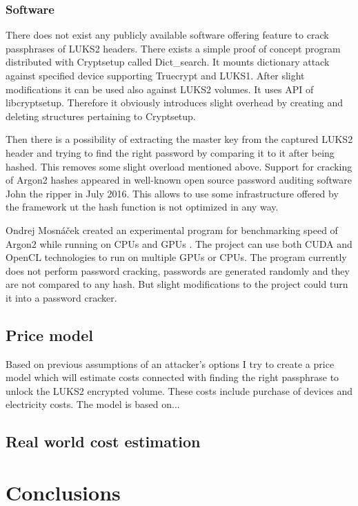 \documentclass[nolof]{fithesis3}
\begin{document}
\subsection{Software}
There does not exist any publicly available software offering feature to crack passphrases of LUKS2 headers. There exists a simple proof of concept program distributed with Cryptsetup called Dict\_search. It mounts dictionary attack against specified device supporting Truecrypt and LUKS1. After slight modifications it can be used also against LUKS2 volumes. It uses API of libcryptsetup. Therefore it obviously introduces slight overhead by creating and deleting structures pertaining to Cryptsetup.

Then there is a possibility of extracting the master key from the captured LUKS2 header and trying to find the right password by comparing it to it after being hashed. This removes some slight overload mentioned above. Support for cracking of Argon2 hashes appeared in well-known open source password auditing software John the ripper in July 2016. This allows to use some infrastructure offered by the framework ut the hash function is not optimized in any way.

Ondrej Mosnáček created an experimental program for benchmarking speed of Argon2 while running on CPUs and GPUs \parencite{argon2gpu}. The project can use both CUDA and OpenCL technologies to run on multiple GPUs or CPUs. The program currently does not perform password cracking, passwords are generated randomly and they are not compared to any hash. But slight modifications to the project could turn it into a password cracker.

\section{Price model}
Based on previous assumptions of an attacker's options I try to create a price model which will estimate costs connected with finding the right passphrase to unlock the LUKS2 encrypted volume. These costs include purchase of devices and electricity costs. The model is based on...



\section{Real world cost estimation}



\chapter{Conclusions}

\printbibliography
\end{document}
